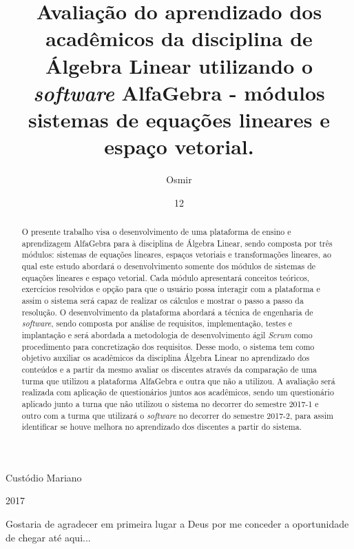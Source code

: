 \documentclass[tcc1]{uftex}
\begin{document}
  \title{Avaliação do aprendizado dos acadêmicos da disciplina de Álgebra Linear utilizando o \textit{software} AlfaGebra - módulos sistemas de equações lineares e espaço vetorial.}
  \author{Osmir}{Custódio Mariano}
  
  \date{12}{2017}



  \maketitle

 \frontmatter
 \dedication{Dedico este trabalho aos meus pais, Orlando Mariano da Silva e Maria Gorete Ramos Custódio, que não mediram esforços para que eu chegasse até aqui.}

  \begin{acknowledgement}
  Gostaria de agradecer em primeira lugar a Deus por me conceder a oportunidade de chegar até aqui...
  \end{acknowledgement}

\begin{abstract}
    O presente trabalho visa o desenvolvimento de uma plataforma de ensino e aprendizagem AlfaGebra para à disciplina de Álgebra Linear, sendo composta por três módulos: sistemas de equações lineares, espaços vetoriais e transformações lineares, ao qual este estudo abordará o desenvolvimento somente dos módulos de sistemas de equações lineares e espaço vetorial. Cada módulo apresentará conceitos teóricos, exercícios resolvidos e opção para que o usuário possa interagir com a plataforma e assim o sistema será capaz de realizar os cálculos e mostrar o passo a passo da resolução. O desenvolvimento da plataforma abordará a técnica de engenharia de \textit{software}, sendo composta por análise de requisitos, implementação, testes e implantação e será abordada a metodologia de desenvolvimento ágil \textit{Scrum} como procedimento para concretização dos requisitos. Desse modo, o sistema tem como objetivo auxiliar os acadêmicos da disciplina Álgebra Linear no aprendizado dos conteúdos e a partir da mesmo avaliar os discentes através da comparação de uma turma que utilizou a plataforma AlfaGebra e outra que não a utilizou. A avaliação será realizada com aplicação de questionários juntos aos acadêmicos, sendo um questionário aplicado junto a turna que não utilizou o sistema no decorrer do semestre 2017-1 e outro com a turma que utilizará o \textit{software} no decorrer do semestre 2017-2, para assim identificar se houve melhora no aprendizado dos discentes a partir do sistema.
\end{abstract}
  
\end{document}
